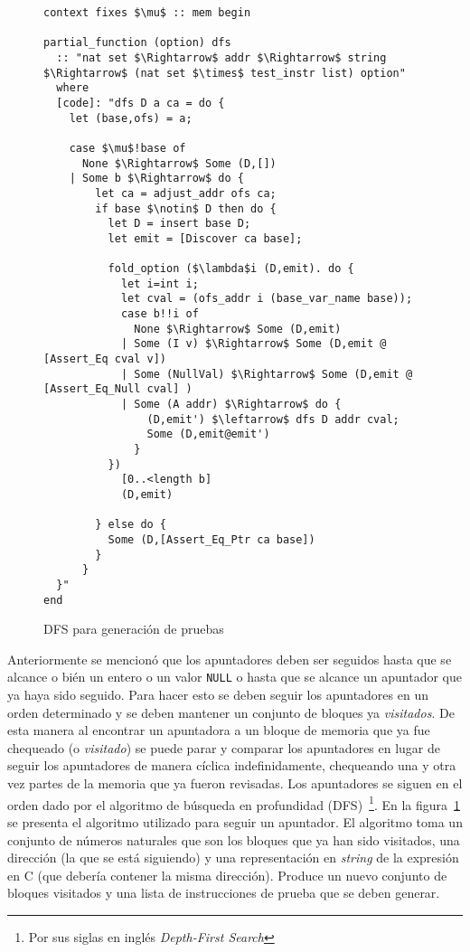 \begin{figure}
\begin{lstlisting}[mathescape=true]
context fixes $\mu$ :: mem begin

partial_function (option) dfs
  :: "nat set $\Rightarrow$ addr $\Rightarrow$ string $\Rightarrow$ (nat set $\times$ test_instr list) option"
  where
  [code]: "dfs D a ca = do {
    let (base,ofs) = a;

    case $\mu$!base of
      None $\Rightarrow$ Some (D,[])
    | Some b $\Rightarrow$ do {
        let ca = adjust_addr ofs ca;
        if base $\notin$ D then do {
          let D = insert base D;
          let emit = [Discover ca base];

          fold_option ($\lambda$i (D,emit). do {
            let i=int i;
            let cval = (ofs_addr i (base_var_name base));
            case b!!i of
              None $\Rightarrow$ Some (D,emit)
            | Some (I v) $\Rightarrow$ Some (D,emit @ [Assert_Eq cval v])
            | Some (NullVal) $\Rightarrow$ Some (D,emit @ [Assert_Eq_Null cval] )
            | Some (A addr) $\Rightarrow$ do {
                (D,emit') $\leftarrow$ dfs D addr cval;
                Some (D,emit@emit')
              }
          })
            [0..<length b]
            (D,emit)

        } else do {
          Some (D,[Assert_Eq_Ptr ca base])
        }
      }
  }"
end
\end{lstlisting}

\caption{DFS para generación de pruebas}
\label{fig:dfs_test}
\end{figure}

Anteriormente se mencionó que los apuntadores deben ser seguidos hasta que se alcance o bién un entero o un valor \verb|NULL| o hasta que se alcance un apuntador que ya haya sido seguido.
Para hacer esto se deben seguir los apuntadores en un orden determinado y se deben mantener un conjunto de bloques ya \textit{visitados}.
De esta manera al encontrar un apuntadora a un bloque de memoria que ya fue chequeado (o \textit{visitado}) se puede parar y comparar los apuntadores en lugar de seguir los apuntadores de manera cíclica indefinidamente, chequeando una y otra vez partes de la memoria que ya fueron revisadas.
Los apuntadores se siguen en el orden dado por el algoritmo de búsqueda en profundidad (DFS)~\footnote{Por sus siglas en inglés \textit{Depth-First Search}}.
En la figura~\ref{fig:dfs_test} se presenta el algoritmo utilizado para seguir un apuntador.
El algoritmo toma un conjunto de números naturales que son los bloques que ya han sido visitados, una dirección (la que se está siguiendo) y una representación en \textit{string} de la expresión en C (que debería contener la misma dirección).
Produce un nuevo conjunto de bloques visitados y una lista de instrucciones de prueba que se deben generar.

